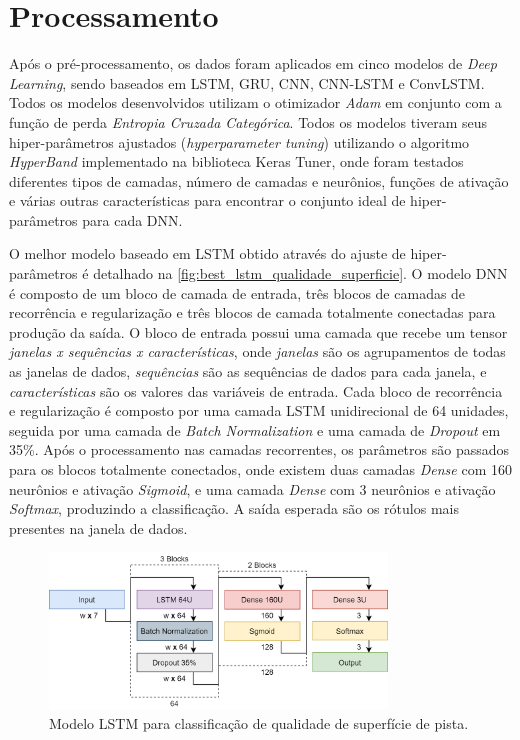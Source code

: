 \section{Processamento}

Após o pré-processamento, os dados foram aplicados em cinco modelos de \textit{Deep Learning}, sendo baseados em LSTM, GRU, CNN, CNN-LSTM e ConvLSTM. Todos os modelos desenvolvidos utilizam o otimizador \emph{Adam} em conjunto com a função de perda \emph{Entropia Cruzada Categórica}. Todos os modelos tiveram seus hiper-parâmetros ajustados (\textit{hyperparameter tuning}) utilizando o algoritmo \textit{HyperBand} implementado na biblioteca Keras Tuner, onde foram testados diferentes tipos de camadas, número de camadas e neurônios, funções de ativação e várias outras características para encontrar o conjunto ideal de hiper-parâmetros para cada DNN. 

O melhor modelo baseado em LSTM obtido através do ajuste de hiper-parâmetros é detalhado na \autoref{fig:best_lstm_qualidade_superficie}. O modelo DNN é composto de um bloco de camada de entrada, três blocos de camadas de recorrência e regularização e três blocos de camada totalmente conectadas para produção da saída. O bloco de entrada possui uma camada que recebe um tensor \emph{janelas x sequências x características}, onde \emph{janelas} são os agrupamentos de todas as janelas de dados, \emph{sequências} são as sequências de dados para cada janela, e \emph{características} são os valores das variáveis de entrada. Cada bloco de recorrência e regularização é composto por uma camada LSTM unidirecional de 64 unidades, seguida por uma camada de \textit{Batch Normalization} e uma camada de \textit{Dropout} em 35\%. Após o processamento nas camadas recorrentes, os parâmetros são passados para os blocos totalmente conectados, onde existem duas camadas \textit{Dense} com 160 neurônios e ativação \textit{Sigmoid}, e uma camada \textit{Dense} com 3 neurônios e ativação \textit{Softmax}, produzindo a classificação. A saída esperada são os rótulos mais presentes na janela de dados.

\begin{figure}[h!]
  \centering
  \caption{Modelo LSTM para classificação de qualidade de superfície de pista.}
  \label{fig:best_lstm_qualidade_superficie}
  \includegraphics[width=0.8\textwidth]{figuras/fig_46.png}
\end{figure}

